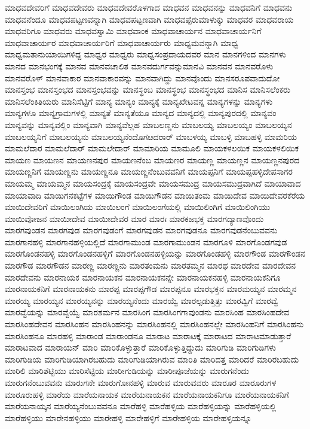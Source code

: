 {ಮಾಧವದೇವರಿಗೆ
ಮಾಧವದೇವರು
ಮಾಧವದೇವರೊಳಗಾದ
ಮಾಧವನ
ಮಾಧವನನ್ನು
ಮಾಧವನಿಗೆ
ಮಾಧವನು
ಮಾಧವನೆಂದೂ
ಮಾಧವಪಟ್ಟಣವನ್ನಾಗಿ
ಮಾಧವಪಟ್ಟಣವಾಗಿ
ಮಾಧವಪ್ಪೆರುಮಾಳುಕ್ಕು
ಮಾಧವರ
ಮಾಧವರಾಯ
ಮಾಧವರಿಗೂ
ಮಾಧವರು
ಮಾಧವಸ್ವಾಮಿ
ಮಾಧವಾಂಕ
ಮಾಧವಾಚಾರ್ಯನ
ಮಾಧವಾಚಾರ್ಯನಿಗೆ
ಮಾಧವಾಚಾರ್ಯರ
ಮಾಧವಾಚಾರ್ಯರಿಗೆ
ಮಾಧವಾಚಾರ್ಯರು
ಮಾಧ್ಯಮವನ್ನಾಗಿ
ಮಾಧ್ವ
ಮಾಧ್ವಮತಾನುಯಾಯಿಗಳಿದ್ದ
ಮಾಧ್ವರ
ಮಾಧ್ವರು
ಮಾಧ್ವಸಂಪ್ರದಾಯದವರ
ಮಾನ
ಮಾನಗಳಿಂದ
ಮಾನಗಳು
ಮಾನದ
ಮಾನಭಂಗಕ್ಕೆ
ಮಾನವ
ಮಾನವಚಾಲಿತ
ಮಾನವದುರ್ಗವನ್ನುಮಾನವಿ
ಮಾನವನ
ಮಾನವರೊಳು
ಮಾನವರೊಳ್
ಮಾನವಾಕಾರ
ಮಾನವಾಕಾರವನ್ನು
ಮಾನವಾಗಿದ್ದು
ಮಾನವೊಂದು
ಮಾನಸರೂಪವಾದುದೋ
ಮಾನಸ್ತಂಭ
ಮಾನಸ್ತಂಭದ
ಮಾನಸ್ತಂಭವನ್ನು
ಮಾನಸ್ಥಂಬ
ಮಾನಸ್ಥಂಭ
ಮಾನಸ್ಥಂಭದ
ಮಾನಿಸ
ಮಾನಿಸಲೆಂಕರು
ಮಾನಿಸಲೆಂಕಿತಿಯರು
ಮಾನಿಸೆಟ್ಟಿಗೆ
ಮಾನ್ಯ
ಮಾನ್ಯಂ
ಮಾನ್ಯಕ್ಕೆ
ಮಾನ್ಯಖೇಟವನ್ನ
ಮಾನ್ಯಗಳನ್ನು
ಮಾನ್ಯಗಳು
ಮಾನ್ಯಗಳೂ
ಮಾನ್ಯಗ್ರಾಮಗಳಲ್ಲಿ
ಮಾನ್ಯತೆ
ಮಾನ್ಯತೆಯೂ
ಮಾನ್ಯದ
ಮಾನ್ಯದಲ್ಲಿ
ಮಾನ್ಯಪುರದಲ್ಲಿ
ಮಾನ್ಯವಂ
ಮಾನ್ಯವನ್ನು
ಮಾನ್ಯವಲ್ಲಿಂ
ಮಾನ್ಯವಾಗಿ
ಮಾನ್ಯವೆಲ್ಲಹ
ಮಾಬಲಣ್ಣನು
ಮಾಬಲಯ್ಯ
ಮಾಬಲಯ್ಯಂ
ಮಾಬಲಯ್ಯನ
ಮಾಬಲಯ್ಯನಿಗೆ
ಮಾಬಲಯ್ಯನು
ಮಾಬಲಯ್ಯನೆಂದೊಗೞದರಾರ್
ಮಾಬಳಯ್ಯ
ಮಾಬಳ್ಳಿ
ಮಾಬಹಳ್ಳಿ
ಮಾಮರಿಯ
ಮಾಮಲೆದಾರ
ಮಾಮಲೆದಾರ್
ಮಾಮಲೇದಾರ್
ಮಾಮಾರಿಯ
ಮಾಮೂಲಿ
ಮಾಯಕಳಲಯಿಕ
ಮಾಯಕಳಲಿಯಿಕ
ಮಾಯಣ
ಮಾಯಣನ
ಮಾಯಣನಪುರ
ಮಾಯಣನೆಂಬ
ಮಾಯಣರ
ಮಾಯಣ್ಣ
ಮಾಯಣ್ಣನ
ಮಾಯಣ್ಣನಪುರದ
ಮಾಯಣ್ಣನಿಗೆ
ಮಾಯಣ್ಣನು
ಮಾಯಣ್ಣನೂ
ಮಾಯಣ್ಣನೆಂಬುವವನಿಗೆ
ಮಾಯಪ್ಪನಿಗೆ
ಮಾಯಪ್ಪಹಳ್ಳಿದೇಪಸಾಗರ
ಮಾಯಮ್ಮ
ಮಾಯಮ್ಮನ
ಮಾಯಸಂದ್ರಕ್ಕೆ
ಮಾಯಸಂದ್ರವೇ
ಮಾಯಸಮುದ್ರ
ಮಾಯಸಮುದ್ರವಾಗಿದೆ
ಮಾಯಾವಾದ
ಮಾಯಾವಾದಿ
ಮಾಯಿಗನಕಟ್ಟೆಗಳ
ಮಾಯಿಗೌಂಡ
ಮಾಯಿಗೌಡನ
ಮಾಯಿತಂಮ
ಮಾಯಿದೇವ
ಮಾಯಿದೇವರಕೆರೆಯ
ಮಾಯಿದೇವರಿಗೆ
ಮಾಯಿಲಂಗಿಯ
ಮಾಯಿಲಂಗೆ
ಮಾಯಿಲಂಗೆಯಲ್ಲಿ
ಮಾಯಿಲಿಂಗಿಗೆ
ಮಾಯಿಲಿಂಗಿಯು
ಮಾಯಿವೋಜನ
ಮಾಯೀದೇವ
ಮಾಯೀದೇವರ
ಮಾರ
ಮಾರಃ
ಮಾರಕಜಭಕ್ತ
ಮಾರಗದ್ಯಾಣವೊಂದು
ಮಾರಗವುಂಡನ
ಮಾರಗವುಡ
ಮಾರಗವುಡಂಗೆ
ಮಾರಗವುಡನ
ಮಾರಗವುಡನೂ
ಮಾರಗವುಡನೆಂಬುವವನು
ಮಾರಗಾನಹಳ್ಳಿ
ಮಾರಗಾನಹಳ್ಳಿಯಲ್ಲಿದೆ
ಮಾರಗಾಮುಂಡ
ಮಾರಗಾಮುಂಡನ
ಮಾರಗೂಳಿ
ಮಾರಗೊಂಡಗವುಡ
ಮಾರಗೊಂಡನಹಳ್ಳಿ
ಮಾರಗೊಂಡನಹಳ್ಳಿಗೆ
ಮಾರಗೊಂಡನಹಳ್ಳಿಯನ್ನು
ಮಾರಗೊಂಡಹಳ್ಳಿ
ಮಾರಗೌಂಡ
ಮಾರಗೌಂಡನ
ಮಾರಗೌಡ
ಮಾರಗೌಡನ
ಮಾರಣ್ಣ
ಮಾರಣ್ಣನು
ಮಾರತಂಮನು
ಮಾರತಮ್ಮನ
ಮಾರಥ
ಮಾರದೇವ
ಮಾರದೇವನ
ಮಾರದೇವನು
ಮಾರನಾಯಕ
ಮಾರನಾಯಕನ
ಮಾರನಾಯಕನನ್ನೇ
ಮಾರನಾಯಕನಹಳ್ಳಿ
ಮಾರನಾಯಕನಿಗೂ
ಮಾರನಾಯಕನಿಗೆ
ಮಾರನಾಯಕನು
ಮಾರಪ್ಪ
ಮಾರಪ್ಪಗೌಡ
ಮಾರಪ್ಪನೂ
ಮಾರಭಕ್ತನ
ಮಾರಮಯ್ಯನ
ಮಾರಮ್ಮನ
ಮಾರಯ್ಯ
ಮಾರಯ್ಯನ
ಮಾರಯ್ಯನನ್ನು
ಮಾರಯ್ಯನೆಂದು
ಮಾರಯ್ವೆ
ಮಾರಲ್ಪಡುತ್ತಿತ್ತು
ಮಾರವ್ವಿಗೆ
ಮಾರವ್ವೆ
ಮಾರವ್ವೆಯನ್ನು
ಮಾರವ್ವೆಯ್ವೆ
ಮಾರಶರ್ಮನ
ಮಾರಸಿಂಗ
ಮಾರಸಿಂಗಗಾವುಂಡನು
ಮಾರಸಿಂಹ
ಮಾರಸಿಂಹದೇವ
ಮಾರಸಿಂಹದೇವನ
ಮಾರಸಿಂಹನ
ಮಾರಸಿಂಹನನ್ನು
ಮಾರಸಿಂಹನಲ್ಲಿ
ಮಾರಸಿಂಹನಲ್ಲೇ
ಮಾರಸಿಂಹನಿಗೆ
ಮಾರಸಿಂಹನು
ಮಾರಸಿಂಹನೂ
ಮಾರಹಳ್ಳಿ
ಮಾರಾಂಡ
ಮಾರಾಂಡನೂ
ಮಾರಾಟ
ಮಾರಾಟಕ್ಕೆ
ಮಾರಾಟದ
ಮಾರಾಟಮಾಡುತ್ತಾರೆ
ಮಾರಾಟವಾದ
ಮಾರಾಯನ್
ಮಾರಿ
ಮಾರಿಕೊಳ್ಳುತ್ತಾರೆ
ಮಾರಿಕೊಳ್ಳುತ್ತಿದ್ದುದು
ಮಾರಿಗುಡಿ
ಮಾರಿಗುಡಿಗಳು
ಮಾರಿಗುಡಿಯ
ಮಾರಿಗುಡಿಯಾಗಿರಬಹುದು
ಮಾರಿಗುಡಿಯಾಗಿರುವ
ಮಾರಿತಿ
ಮಾರಿದತ್ತ
ಮಾರಿದರೆ
ಮಾರಿರಬಹುದು
ಮಾರಿಲಿ
ಮಾರಿಶೆಟ್ಟಿಯು
ಮಾರಿಸೆಟ್ಟಿಯ
ಮಾರೀಗುಡಿಯನ್ನು
ಮಾರೀಪೂಜೆಯನ್ನು
ಮಾರುಗನೆಂದು
ಮಾರುಗನೆಂಬುವವನು
ಮಾರುಗನೇ
ಮಾರುಗೋನಹಳ್ಳಿ
ಮಾರುವ
ಮಾರುವವರು
ಮಾರೂರ
ಮಾರೂರುಗಳ
ಮಾರೂರುಹಳ್ಳಿ
ಮಾರೆಯ
ಮಾರೆಯನಾಯಕ
ಮಾರೆಯನಾಯಕನ
ಮಾರೆಯನಾಯಕನಿಗೂ
ಮಾರೆಯನಾಯಕನಿಗೆ
ಮಾರೆಯನಾಯ್ಕನ
ಮಾರೆಯ್ಯನೆಂಬುವವನೂ
ಮಾರೆಹಳ್ಳಿ
ಮಾರೆಹಳ್ಳಿಯ
ಮಾರೆಹಳ್ಳಿಯನ್ನು
ಮಾರೆಹಳ್ಳಿಯಲ್ಲಿ
ಮಾರೆಹಳ್ಳಿಯು
ಮಾರೇನಹಳ್ಳಿಯು
ಮಾರೇಹಳ್ಳಿ
ಮಾರೇಹಳ್ಳಿಗೆ
ಮಾರೇಹಳ್ಳಿಯ
ಮಾರೇಹಳ್ಳಿಯನ್ನೂ
}
